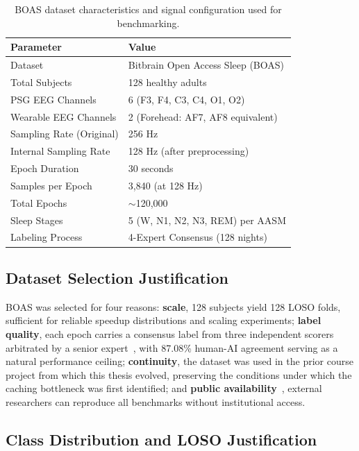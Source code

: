 \begin{table}[ht]
\centering
\begin{tabular}{ll}
\toprule
\textbf{Parameter} & \textbf{Value} \\
\midrule
Dataset & Bitbrain Open Access Sleep (BOAS) \\
Total Subjects & 128 healthy adults \\
PSG EEG Channels & 6 (F3, F4, C3, C4, O1, O2) \\
Wearable EEG Channels & 2 (Forehead: AF7, AF8 equivalent) \\
Sampling Rate (Original) & 256 Hz \\
Internal Sampling Rate & 128 Hz (after preprocessing) \\
Epoch Duration & 30 seconds \\
Samples per Epoch & 3,840 (at 128 Hz) \\
Total Epochs & $\sim$120,000 \\
Sleep Stages & 5 (W, N1, N2, N3, REM) per AASM \\
Labeling Process & 4-Expert Consensus (128 nights) \\
\bottomrule
\end{tabular}
\caption[BOAS dataset characteristics]{BOAS dataset characteristics and signal configuration used for benchmarking.}
\label{tab:dataset_overview}
\end{table}

\subsection{Dataset Selection Justification}

BOAS was selected for four reasons: \textbf{scale}, 128 subjects yield 128 LOSO folds, sufficient for reliable speedup distributions and scaling experiments; \textbf{label quality}, each epoch carries a consensus label from three independent scorers arbitrated by a senior expert~\cite{esparza2026automatic}, with 87.08\% human-AI agreement serving as a natural performance ceiling; \textbf{continuity}, the dataset was used in the prior course project from which this thesis evolved, preserving the conditions under which the caching bottleneck was first identified; and \textbf{public availability}~\cite{boas_dataset}, external researchers can reproduce all benchmarks without institutional access.

\subsection{Class Distribution and LOSO Justification}

